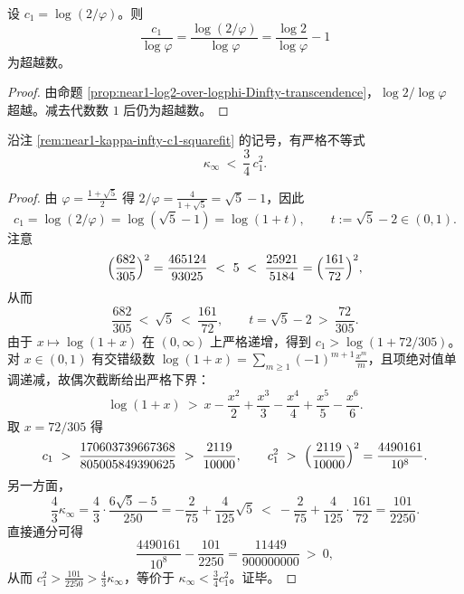 \begin{corollary}[归一化漂移指数的超越性]\label{cor:near1-normalized-c1-over-logphi-transcendence}
设 \(c_1=\log(2/\varphi)\)。则
\[
\frac{c_1}{\log\varphi}
=\frac{\log(2/\varphi)}{\log\varphi}
=\frac{\log2}{\log\varphi}-1
\]
为超越数。
\end{corollary}
\begin{proof}
由命题 \ref{prop:near1-log2-over-logphi-Dinfty-transcendence}，\(\log2/\log\varphi\) 超越。减去代数数 \(1\) 后仍为超越数。
\end{proof}

\begin{proposition}\label{prop:near1-kappa-infty-c1-strict-ineq}
沿注 \ref{rem:near1-kappa-infty-c1-squarefit} 的记号，有严格不等式
\[
\kappa_\infty\ <\ \frac34\,c_1^2.
\]
\end{proposition}
\begin{proof}
由 \(\varphi=\frac{1+\sqrt5}{2}\) 得
\(
2/\varphi=\frac{4}{1+\sqrt5}=\sqrt5-1
\)，因此
\[
c_1=\log(2/\varphi)=\log(\sqrt5-1)=\log(1+t),\qquad t:=\sqrt5-2\in(0,1).
\]
注意
\[
\Bigl(\frac{682}{305}\Bigr)^2=\frac{465124}{93025}\ <\ 5\ <\ \frac{25921}{5184}=\Bigl(\frac{161}{72}\Bigr)^2,
\]
从而
\[
\frac{682}{305}\ <\ \sqrt5\ <\ \frac{161}{72},\qquad t=\sqrt5-2\ >\ \frac{72}{305}.
\]
由于 \(x\mapsto \log(1+x)\) 在 \((0,\infty)\) 上严格递增，得到
\(
c_1>\log(1+72/305)
\)。
对 \(x\in(0,1)\) 有交错级数
\(
\log(1+x)=\sum_{m\ge 1}(-1)^{m+1}\frac{x^m}{m}
\)，且项绝对值单调递减，故偶次截断给出严格下界：
\[
\log(1+x)\ >\ x-\frac{x^2}{2}+\frac{x^3}{3}-\frac{x^4}{4}+\frac{x^5}{5}-\frac{x^6}{6}.
\]
取 \(x=72/305\) 得
\[
c_1\ >\ \frac{170603739667368}{805005849390625}\ >\ \frac{2119}{10000},
\qquad
c_1^2\ >\ \Bigl(\frac{2119}{10000}\Bigr)^2=\frac{4490161}{10^8}.
\]
另一方面，
\[
\frac{4}{3}\kappa_\infty
=\frac{4}{3}\cdot\frac{6\sqrt5-5}{250}
=-\frac{2}{75}+\frac{4}{125}\sqrt5
\ <\ -\frac{2}{75}+\frac{4}{125}\cdot\frac{161}{72}
=\frac{101}{2250}.
\]
直接通分可得
\[
\frac{4490161}{10^8}-\frac{101}{2250}=\frac{11449}{900000000}\ >\ 0,
\]
从而 \(c_1^2>\frac{101}{2250}>\frac43\kappa_\infty\)，等价于 \(\kappa_\infty<\frac34 c_1^2\)。证毕。
\end{proof}

